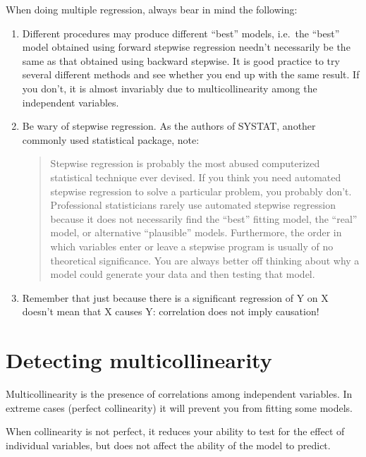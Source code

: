 \documentclass[
  12pt,
]{book}
\makeatletter
\newenvironment{kframe}{%
\medskip{}
\setlength{\fboxsep}{.8em}
\def\at@end@of@kframe{}%
\ifinner\ifhmode%
 \def\at@end@of@kframe{\end{minipage}}%
 \begin{minipage}{\columnwidth}%
\fi\fi%
\def\FrameCommand##1{\hskip\@totalleftmargin \hskip-\fboxsep
\colorbox{incolor}{##1}\hskip-\fboxsep
    \hskip-\linewidth \hskip-\@totalleftmargin \hskip\columnwidth}%
\MakeFramed {\advance\hsize-\width
  \@totalleftmargin\z@ \linewidth\hsize
  \@setminipage}}%
{\par\unskip\endMakeFramed%
\at@end@of@kframe}
\newenvironment{rmdblock}[1]
 {
 \begin{itemize}
 \renewcommand{\labelitemi}{
   \raisebox{-.7\height}[0pt][0pt]{
     {\setkeys{Gin}{width=3em,keepaspectratio}\texttt{[image: images/\#1]}}
   }
 }
 \begin{kframe}
 \setlength{\fboxsep}{1em}
 \item
 }
 {
 \end{kframe}
 \end{itemize}
 }
\newenvironment{rmdwarning}
  {\begin{rmdblock}{warning}}
  {\end{rmdblock}}
\makeatother
\begin{document}
When doing multiple regression, always bear in mind the following:

\begin{enumerate}
\def\labelenumi{\arabic{enumi}.}
\item
  Different procedures may produce different ``best'' models, i.e.~the ``best'' model obtained using forward stepwise regression needn't necessarily be the same as that obtained using backward stepwise. It is good practice to try several different methods and see whether you end up with the same result. If you don't, it is almost invariably due to multicollinearity among the independent variables.
\item
  Be wary of stepwise regression. As the authors of SYSTAT, another commonly used statistical package, note:

  \begin{quote}
  Stepwise regression is probably the most abused computerized statistical technique ever devised. If you think you need automated stepwise regression to solve a particular problem, you probably don't. Professional statisticians rarely use automated stepwise regression because it does not necessarily find the ``best'' fitting model, the ``real'' model, or alternative ``plausible'' models. Furthermore, the order in which variables enter or leave a stepwise program is usually of no theoretical significance. You are always better off thinking about why a model could generate your data and then testing that model.
  \end{quote}
\item
  Remember that just because there is a significant regression of Y on X doesn't mean that X causes Y: correlation does not imply causation!
\end{enumerate}

\hypertarget{detecting-multicollinearity}{%
\section{Detecting multicollinearity}\label{detecting-multicollinearity}}

Multicollinearity is the presence of correlations among independent variables. In extreme cases (perfect collinearity) it will prevent you from fitting some models.

\begin{rmdwarning}
When collinearity is not perfect, it reduces your ability to test for the effect of individual variables, but does not affect the ability of the model to predict.
\end{rmdwarning}
\end{document}
